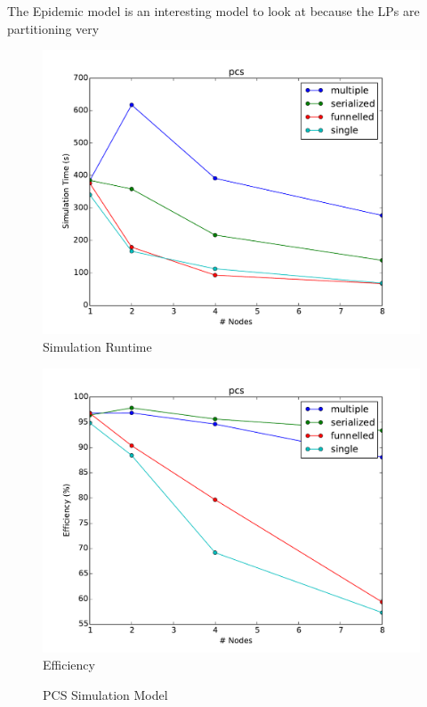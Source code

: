 \documentclass[11pt]{book}
\begin{document}
The Epidemic model is an interesting model to look at because the LPs are partitioning very

\begin{figure}
  \begin{minipage}{.5\textwidth}
    \begin{center}
      \includegraphics[width=\textwidth,keepaspectratio,quiet]{figs/partitioning_communication/communication_pcs_time.pdf} \\
      Simulation Runtime \\
    \end{center}
  \end{minipage}%
  \hfill
  \begin{minipage}{.5\textwidth}
    \begin{center}
      \includegraphics[width=\textwidth,keepaspectratio,quiet]{figs/partitioning_communication/communication_pcs_efficiency.pdf} \\
      Efficiency
    \end{center}
  \end{minipage}
  \caption{PCS Simulation Model}\label{pcs_communication}
\end{figure}
\end{document}
